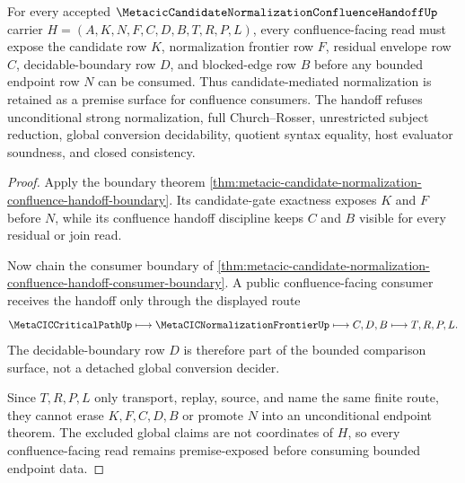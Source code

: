\begin{theorem}
\label{thm:metacic-candidate-normalization-confluence-handoff-premise-exposure}
For every accepted $\MetacicCandidateNormalizationConfluenceHandoffUp$ carrier $H=(A,K,N,F,C,D,B,T,R,P,L)$, every confluence-facing read must expose the candidate row $K$, normalization frontier row $F$, residual envelope row $C$, decidable-boundary row $D$, and blocked-edge row $B$ before any bounded endpoint row $N$ can be consumed. Thus candidate-mediated normalization is retained as a premise surface for confluence consumers. The handoff refuses unconditional strong normalization, full Church--Rosser, unrestricted subject reduction, global conversion decidability, quotient syntax equality, host evaluator soundness, and closed consistency.
\end{theorem}
\begin{proof}
Apply the boundary theorem \autoref{thm:metacic-candidate-normalization-confluence-handoff-boundary}. Its candidate-gate exactness exposes $K$ and $F$ before $N$, while its confluence handoff discipline keeps $C$ and $B$ visible for every residual or join read.

Now chain the consumer boundary of \autoref{thm:metacic-candidate-normalization-confluence-handoff-consumer-boundary}. A public confluence-facing consumer receives the handoff only through the displayed route
$$
\MetaCICCriticalPathUp \longmapsto \MetaCICNormalizationFrontierUp \longmapsto C,D,B \longmapsto T,R,P,L .
$$
The decidable-boundary row $D$ is therefore part of the bounded comparison surface, not a detached global conversion decider.

Since $T,R,P,L$ only transport, replay, source, and name the same finite route, they cannot erase $K,F,C,D,B$ or promote $N$ into an unconditional endpoint theorem. The excluded global claims are not coordinates of $H$, so every confluence-facing read remains premise-exposed before consuming bounded endpoint data.
\end{proof}

